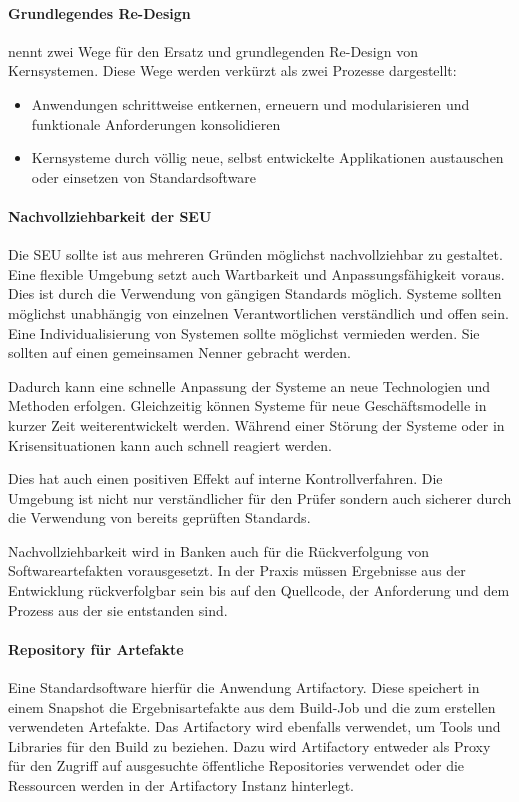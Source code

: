 \paragraph{Grundlegendes Re-Design}
\label{ansatz:modularisieren}
\citet{Bussmann2006} nennt zwei Wege für den Ersatz und grundlegenden Re-Design von Kernsystemen. Diese Wege werden verkürzt als zwei Prozesse dargestellt:
\begin{itemize}
    \item Anwendungen schrittweise entkernen, erneuern und modularisieren und funktionale Anforderungen konsolidieren
    \item Kernsysteme durch völlig neue, selbst entwickelte Applikationen austauschen oder einsetzen von Standardsoftware
\end{itemize}

\paragraph{Nachvollziehbarkeit der SEU}
Die \ac{SEU} sollte ist aus mehreren Gründen möglichst nachvollziehbar zu gestaltet. Eine flexible Umgebung setzt auch Wartbarkeit und Anpassungsfähigkeit voraus. Dies ist durch die Verwendung von gängigen Standards möglich. Systeme sollten möglichst unabhängig von einzelnen Verantwortlichen verständlich und offen sein. Eine Individualisierung von Systemen sollte möglichst vermieden werden. Sie sollten auf einen gemeinsamen Nenner gebracht werden.

Dadurch kann eine schnelle Anpassung der Systeme an neue Technologien und Methoden erfolgen. Gleichzeitig können Systeme für neue Geschäftsmodelle in kurzer Zeit weiterentwickelt werden. Während einer Störung der Systeme oder in Krisensituationen kann auch schnell reagiert werden.

Dies hat auch einen positiven Effekt auf interne Kontrollverfahren. Die Umgebung ist nicht nur verständlicher für den Prüfer sondern auch sicherer durch die Verwendung von bereits geprüften Standards.

Nachvollziehbarkeit wird in Banken auch für die Rückverfolgung von Softwareartefakten vorausgesetzt. In der Praxis müssen Ergebnisse aus der Entwicklung rückverfolgbar sein bis auf den Quellcode, der Anforderung und dem Prozess aus der sie entstanden sind.

\paragraph{Repository für Artefakte}
Eine Standardsoftware hierfür die Anwendung Artifactory. Diese speichert in einem Snapshot die Ergebnisartefakte aus dem Build-Job und die zum erstellen verwendeten Artefakte. Das Artifactory wird ebenfalls verwendet, um Tools und Libraries für den Build zu beziehen. Dazu wird Artifactory entweder als Proxy für den Zugriff auf ausgesuchte öffentliche Repositories verwendet oder die Ressourcen werden in der Artifactory Instanz hinterlegt.

